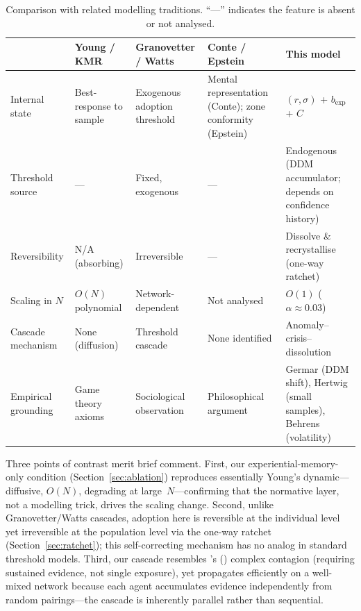 \documentclass[11pt,a4paper]{article}
\begin{document}
\begin{table}[H]
\centering
\caption{Comparison with related modelling traditions. ``---'' indicates the feature is absent or not analysed.}
\label{tab:lit_comparison}
\small
\begin{tabular}{@{}p{2.4cm} p{2.6cm} p{2.6cm} p{2.6cm} p{2.6cm}@{}}
\toprule
& \textbf{Young / KMR} \citep{young1993evolution,kandori1993learning,ellison1993learning} & \textbf{Granovetter / Watts} \citep{granovetter1978threshold,watts2002simple} & \textbf{Conte / Epstein} \citep{conte1995cognitive,epstein2001learning} & \textbf{This model} \\
\midrule
Internal state & Best-response to sample & Exogenous adoption threshold & Mental representation (Conte); zone conformity (Epstein) & $(r, \sigma)$ + $b_{\exp}$ + $C$ \\
\addlinespace
Threshold source & --- & Fixed, exogenous & --- & Endogenous (DDM accumulator; depends on confidence history) \\
\addlinespace
Reversibility & N/A (absorbing) & Irreversible & --- & Dissolve \& recrystallise (one-way ratchet) \\
\addlinespace
Scaling in $N$ & $O(N)$ polynomial & Network-dependent & Not analysed & $O(1)$ ($\alpha \approx 0.03$) \\
\addlinespace
Cascade mechanism & None (diffusion) & Threshold cascade & None identified & Anomaly--crisis--dissolution \\
\addlinespace
Empirical grounding & Game theory axioms & Sociological observation & Philosophical argument & Germar (DDM shift), Hertwig (small samples), Behrens (volatility) \\
\bottomrule
\end{tabular}
\end{table}

Three points of contrast merit brief comment.  First, our experiential-memory-only condition (Section~\ref{sec:ablation}) reproduces essentially Young's dynamic---diffusive, $O(N)$, degrading at large~$N$---confirming that the normative layer, not a modelling trick, drives the scaling change.  Second, unlike Granovetter/Watts cascades, adoption here is reversible at the individual level yet irreversible at the population level via the one-way ratchet (Section~\ref{sec:ratchet}); this self-correcting mechanism has no analog in standard threshold models.  Third, our cascade resembles \citeauthor{centola2007complex}'s (\citeyear{centola2007complex}) complex contagion (requiring sustained evidence, not single exposure), yet propagates efficiently on a well-mixed network because each agent accumulates evidence independently from random pairings---the cascade is inherently parallel rather than sequential.
\end{document}
